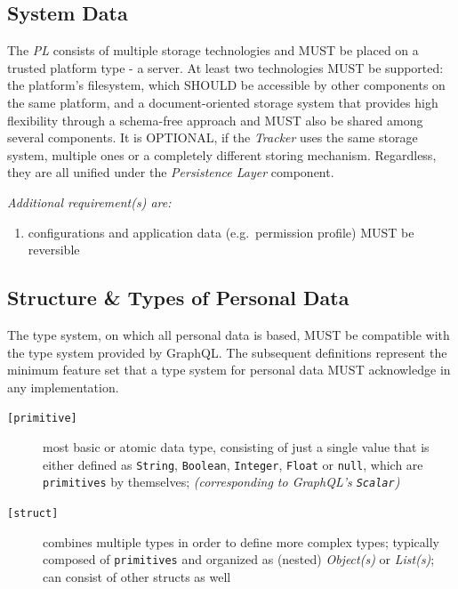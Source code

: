 \documentclass[12pt,english,a4paper,titlepage,cleardoublepage=empty,dottedtoc]{report}
\providecommand{\tightlist}{%
  \setlength{\itemsep}{0pt}\setlength{\parskip}{0pt}}
\begin{document}
\subsection{System Data}\label{system-data}

The \emph{PL} consists of multiple storage technologies and MUST be
placed on a trusted platform type - a server. At least two technologies
MUST be supported: the platform's filesystem, which SHOULD be accessible
by other components on the same platform, and a document-oriented
storage system that provides high flexibility through a schema-free
approach and MUST also be shared among several components. It is
OPTIONAL, if the \emph{Tracker} uses the same storage system, multiple
ones or a completely different storing mechanism. Regardless, they are
all unified under the \emph{Persistence Layer} component.

\emph{Additional requirement(s) are:}

\begin{enumerate}
\def\labelenumi{\alph{enumi})}
\tightlist
\item
  configurations and application data (e.g.~permission profile) MUST be
  reversible
\end{enumerate}

\subsection{Structure \& Types of Personal
Data}\label{structure-types-of-personal-data}

The type system, on which all personal data is based, MUST be compatible
with the type system provided by GraphQL. The subsequent definitions
represent the minimum feature set that a type system for personal data
MUST acknowledge in any implementation.

\begin{description}
\item[\texttt{{[}primitive{]}}]
most basic or atomic data type, consisting of just a single value that
is either defined as \texttt{String}, \texttt{Boolean},
\texttt{Integer}, \texttt{Float} or \texttt{null}, which are
\texttt{primitives} by themselves; \emph{(corresponding to GraphQL's
\texttt{Scalar})}
\item[\texttt{{[}struct{]}}]
combines multiple types in order to define more complex types; typically
composed of \texttt{primitives} and organized as (nested)
\emph{Object(s)} or \emph{List(s)}; can consist of other structs as well
\end{description}
\end{document}
